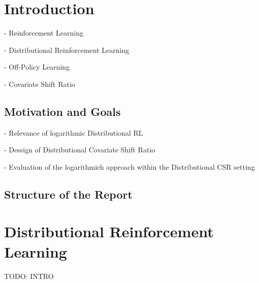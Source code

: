 \documentclass[12pt,a4paper,openright,twoside]{article}
\numberwithin{equation}{section}
\theoremstyle{definition}
\theoremstyle{remark}
\theoremstyle{plain}
\begin{document}
\pagestyle{fancy}
\renewcommand{\sectionmark}[1]{\markboth{\thesection.\quad #1}{}}
\renewcommand{\subsectionmark}[1]{\markright{\thesubsection.\quad #1}}

\setcounter{page}{1}

\thispagestyle{plain}
\section{Introduction}

- Reinforcement Learning

- Distributional Reinforcement Learning

- Off-Policy Learning

- Covariate Shift Ratio




\subsection*{Motivation and Goals}

- Relevance of logarithmic Distributional RL

- Dessign of Distributional Covariate Shift Ratio

- Evaluation of the logarithmich approach within the Distributional CSR setting


\subsection*{Structure of the Report}




\newpage


\thispagestyle{plain}
\section{Distributional Reinforcement Learning}

TODO: INTRO
\end{document}
